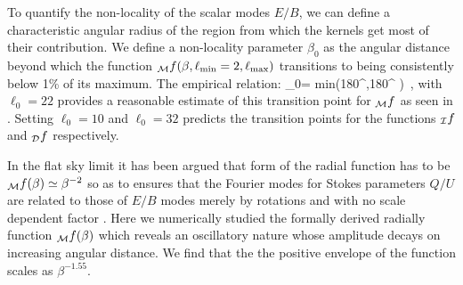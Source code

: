 To quantify the non-locality of the scalar modes $E/B$, we can define a characteristic angular radius of the region from which the kernels get most of their contribution.   We define a non-locality parameter $\beta_{0}$ as the angular distance beyond which the function ${_{\mathcal{M}}f}(\beta,\ell_{\rm min}=2,\ell_{\rm max})$ transitions to being consistently below 1\% of its maximum.
The empirical relation:
\beq
\beta_0= {\rm min}\left(180^\circ,180^\circ {} \right) \,,
\eeq
with $\ell_{0}=22$ provides a reasonable estimate of this transition point for ${}_{\mathcal{M}}f$ as seen in . Setting $\ell_{0}=10$ and $\ell_{0}=32$ predicts the transition points for the functions ${}_{\mathcal{I}}f$ and  ${}_{\mathcal{D}}f$ respectively.%

In the flat sky limit it has been argued that form of the radial function has to be ${}_{\mathcal{M}} f(\beta)\simeq\beta^{-2}$ so as to ensures that the Fourier modes for Stokes parameters $Q/U$ are related  to those of $E/B$ modes merely by rotations and with no scale dependent factor \cite{Zaldarriaga2001a}. Here we numerically studied the formally derived radially function ${}_{\mathcal{M}} f(\beta)$ which reveals an oscillatory nature whose amplitude decays on increasing angular distance. We find that the the positive envelope of the function scales as $\beta^{-1.55}$.

